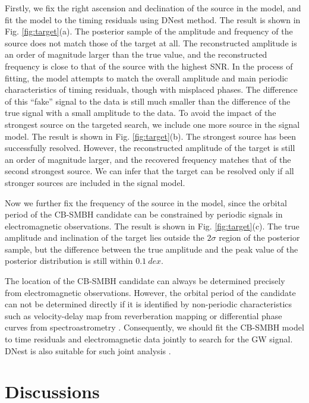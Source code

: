 \documentclass[times,tight]{aastex631}
\begin{document}
Firstly, we fix the right ascension and declination of the source in the model, and fit the model to the timing residuals using DNest method.
The result is shown in Fig. \ref{fig:target}(a).
The posterior sample of the amplitude and frequency of the source does not match those of the target at all.
The reconstructed amplitude is an order of magnitude larger than the true value, and the reconstructed frequency is close to that of the source with the highest SNR.
In the process of fitting, the model attempts to match the overall amplitude and main periodic characteristics of timing residuals, though with misplaced phases.
The difference of this ``fake'' signal to the data is still much smaller than the difference of the true signal with a small amplitude to the data.
To avoid the impact of the strongest source on the targeted search, we include one more source in the signal model.
The result is shown in Fig. \ref{fig:target}(b).
The strongest source has been successfully resolved.
However, the reconstructed amplitude of the target is still an order of magnitude larger, and the recovered frequency matches that of the second strongest source.
We can infer that the target can be resolved only if all stronger sources are included in the signal model.

Now we further fix the frequency of the source in the model, since the orbital period of the CB-SMBH candidate can be constrained by periodic signals in electromagnetic observations.
The result is shown in Fig. \ref{fig:target}(c).
The true amplitude and inclination of the target lies outside the $2\sigma$ region of the posterior sample, but the difference between the true amplitude and the peak value of the posterior distribution is still within $\SI{0.1}{dex}$.

The location of the CB-SMBH candidate can always be determined precisely from electromagnetic observations.
However, the orbital period of the candidate can not be determined directly if it is identified by non-periodic characteristics such as velocity-delay map from reverberation mapping \citep[e.g.][]{wangjm2018} or differential phase curves from spectroastrometry \citep[e.g.][]{songsheng2019}.
Consequently, we should fit the CB-SMBH model to time residuals and electromagnetic data jointly to search for the GW signal.
DNest is also suitable for such joint analysis \citep[e.g.][]{wang2020}.

\section{Discussions}
\end{document}
